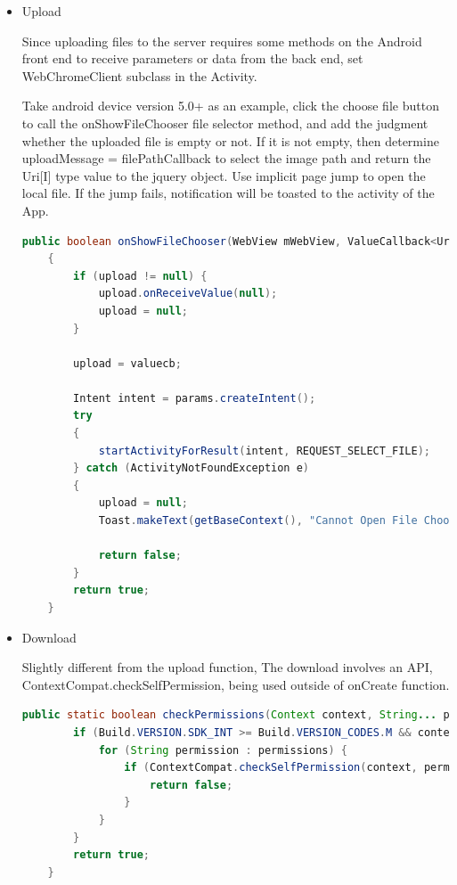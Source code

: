 \documentclass[a4paper,11pt]{article}
\begin{document}
\begin{itemize}
    \item Upload
    \par Since uploading files to the server requires some methods on the Android front end to receive parameters or data from the back end, set WebChromeClient subclass in the Activity.
    \par Take android device version 5.0+ as an example, click the choose file button to call the onShowFileChooser file selector method, and add the judgment whether the uploaded file is empty or not. If it is not empty, then determine uploadMessage = filePathCallback to select the image path and return the Uri[I] type value to the jquery object. Use implicit page jump to open the local file. If the jump fails, notification will be toasted to the activity of the App.
    
    \begin{lstlisting}[language=Java]
      public boolean onShowFileChooser(WebView mWebView, ValueCallback<Uri[]> valuecb, WebChromeClient.FileChooserParams params)
    {
        if (upload != null) {
            upload.onReceiveValue(null);
            upload = null;
        }

        upload = valuecb;

        Intent intent = params.createIntent();
        try
        {
            startActivityForResult(intent, REQUEST_SELECT_FILE);
        } catch (ActivityNotFoundException e)
        {
            upload = null;
            Toast.makeText(getBaseContext(), "Cannot Open File Chooser", Toast.LENGTH_LONG).show();

            return false;
        }
        return true;
    }
    \end{lstlisting}
    \newpage
    \item Download
    \par Slightly different from the upload function, The download involves an API, ContextCompat.checkSelfPermission, being used outside of onCreate function. 
    
    \begin{lstlisting}[language=Java]
    public static boolean checkPermissions(Context context, String... permissions) {
        if (Build.VERSION.SDK_INT >= Build.VERSION_CODES.M && context != null && permissions != null) {
            for (String permission : permissions) {
                if (ContextCompat.checkSelfPermission(context, permission) != PackageManager.PERMISSION_GRANTED) {
                    return false;
                }
            }
        }
        return true;
    }
    \end{lstlisting}
    

\end{itemize}
\end{document}
